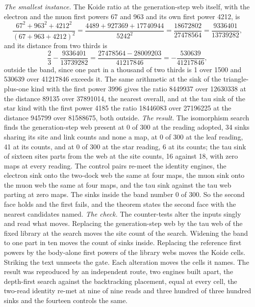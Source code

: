 \begin{chproof}
\textit{The smallest instance.} The Koide ratio at the generation-step web itself, with the electron and the muon first powers 67 and 963 and its own first power 4212, is
\begin{equation} \frac{67^{2} + 963^{2} + 4212^{2}}{(67 + 963 + 4212)^{2}} = \frac{4489 + 927369 + 17740944}{5242^{2}} = \frac{18672802}{27478564} = \frac{9336401}{13739282}, \end{equation}
and its distance from two thirds is
\begin{equation} \frac{2}{3} - \frac{9336401}{13739282} = \frac{27478564 - 28009203}{41217846} = -\frac{530639}{41217846}, \end{equation}
outside the band, since one part in a thousand of two thirds is 1 over 1500 and 530639 over 41217846 exceeds it. The same arithmetic at the sink of the triangle-plus-one kind with the first power 3996 gives the ratio 8449937 over 12630338 at the distance 89135 over 37891014, the nearest overall, and at the tau sink of the star kind with the first power 4185 the ratio 18446083 over 27196225 at the distance 945799 over 81588675, both outside.
\textit{The result.} The isomorphism search finds the generation-step web present at 0 of 300 at the reading adopted, 34 sinks sharing its site and link counts and none a map, at 0 of 300 at the leaf reading, 41 at its counts, and at 0 of 300 at the star reading, 6 at its counts; the tau sink of sixteen sites parts from the web at the site counts, 16 against 18, with zero maps at every reading. The control pairs re-meet the identity engines, the electron sink onto the two-dock web the same at four maps, the muon sink onto the muon web the same at four maps, and the tau sink against the tau web parting at zero maps. The sinks inside the band number 0 of 300. So the second face holds and the first fails, and the theorem states the second face with the nearest candidates named.
\textit{The check.} The counter-tests alter the inputs singly and read what moves. Replacing the generation-step web by the tau web of the fixed library at the search moves the site count of the search. Widening the band to one part in ten moves the count of sinks inside. Replacing the reference first powers by the body-alone first powers of the library webs moves the Koide cells. Striking the text unmeets the gate. Each alteration moves the cells it names. The result was reproduced by an independent route, two engines built apart, the depth-first search against the backtracking placement, equal at every cell, the two-read identity re-met at nine of nine reads and three hundred of three hundred sinks and the fourteen controls the same.
\end{chproof}
\par\medskip{}\label{narr:close:5-10}\par
